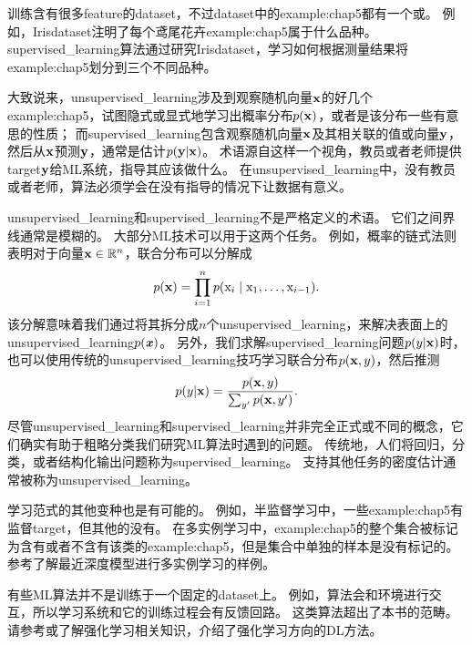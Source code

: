 训练含有很多\gls{feature}的\gls{dataset}，不过\gls{dataset}中的\gls{example:chap5}都有一个或。
例如，Iris\gls{dataset}注明了每个鸢尾花卉\gls{example:chap5}属于什么品种。
\gls{supervised_learning}算法通过研究Iris\gls{dataset}，学习如何根据测量结果将\gls{example:chap5}划分到三个不同品种。

大致说来，\gls{unsupervised_learning}涉及到观察随机向量$\mathbf{x}$的好几个\gls{example:chap5}，试图隐式或显式地学习出概率分布$p(\mathbf{x})$，或者是该分布一些有意思的性质；
而\gls{supervised_learning}包含观察随机向量$\mathbf{x}$及其相关联的值或向量$\mathbf{y}$，然后从$\mathbf{x}$预测$\mathbf{y}$，通常是估计$p(\mathbf{y}|\mathbf{x})$。
术语源自这样一个视角，教员或者老师提供\gls{target}$\mathbf{y}$给\gls{ML}系统，指导其应该做什么。
在\gls{unsupervised_learning}中，没有教员或者老师，算法必须学会在没有指导的情况下让数据有意义。

\gls{unsupervised_learning}和\gls{supervised_learning}不是严格定义的术语。
它们之间界线通常是模糊的。
大部分\gls{ML}技术可以用于这两个任务。
例如，概率的链式法则表明对于向量$\mathbf{x}\in\mathbb{R}^n$，联合分布可以分解成
\begin{equation}
    p(\mathbf{x}) = \prod_{i=1}^n p(\mathrm{x}_i \mid \mathrm{x}_1,\dots,\mathrm{x}_{i-1}) .
\end{equation}
该分解意味着我们通过将其拆分成$n$个\gls{unsupervised_learning}，来解决表面上的\gls{unsupervised_learning}$p(\boldsymbol{\mathit{x}})$。
另外，我们求解\gls{supervised_learning}问题$p(y|\mathbf{x})$时，也可以使用传统的\gls{unsupervised_learning}技巧学习联合分布$p(\mathbf{x},y)$，然后推测
\begin{equation}
    p(y|\mathbf{x}) = \frac{p(\mathbf{x},y)}{\sum_{y'}p(\mathbf{x},y')}.
\end{equation}
尽管\gls{unsupervised_learning}和\gls{supervised_learning}并非完全正式或不同的概念，它们确实有助于粗略分类我们研究\gls{ML}算法时遇到的问题。
传统地，人们将回归，分类，或者结构化输出问题称为\gls{supervised_learning}。
支持其他任务的密度估计通常被称为\gls{unsupervised_learning}。


学习范式的其他变种也是有可能的。
例如，半监督学习中，一些\gls{example:chap5}有监督\gls{target}，但其他的没有。
在多实例学习中，\gls{example:chap5}的整个集合被标记为含有或者不含有该类的\gls{example:chap5}，但是集合中单独的样本是没有标记的。
参考\cite{Kotzias2015}了解最近深度模型进行多实例学习的样例。

有些\gls{ML}算法并不是训练于一个固定的\gls{dataset}上。
例如，算法会和环境进行交互，所以学习系统和它的训练过程会有反馈回路。
这类算法超出了本书的范畴。
请参考\cite{Sutton+Barto-98}或\cite{Bertsekas+Tsitsiklis-book1996}了解强化学习相关知识，\cite{Mnih2013}介绍了强化学习方向的\gls{DL}方法。


